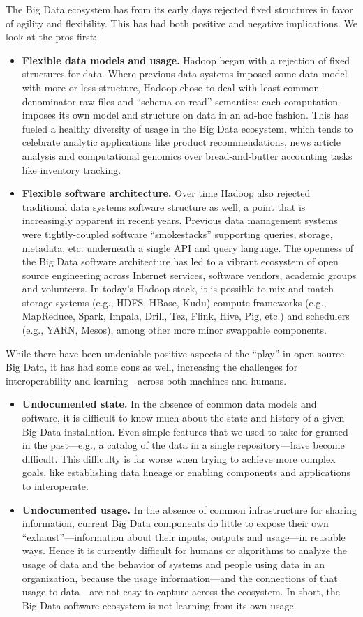 \documentclass[10pt,letterpaper]{article}
\begin{document}
The Big Data ecosystem has from its early days rejected fixed structures in favor of agility and flexibility.  This has had both positive and negative implications.  We look at the pros first:
\begin{itemize}
\item \textbf{Flexible data models and usage.} Hadoop began with a rejection of fixed structures for data.  Where previous data systems imposed some data model with more or less structure, Hadoop chose to deal with least-common-denominator raw files and ``schema-on-read'' semantics: each computation imposes its own model and structure on data in an ad-hoc fashion.  This has fueled a healthy diversity of usage in the Big Data ecosystem, which tends to celebrate analytic applications like product recommendations, news article analysis and computational genomics over bread-and-butter accounting tasks like inventory tracking.
\item \textbf{Flexible software architecture.} Over time Hadoop also rejected traditional data systems software structure as well, a point that is increasingly apparent in recent years.  Previous data management systems were tightly-coupled software ``smokestacks'' supporting queries, storage, metadata, etc. underneath a single API and query language.  The openness of the Big Data software architecture has led to a vibrant ecosystem of open source engineering across Internet services, software vendors, academic groups and volunteers.  In today's Hadoop stack, it is possible to mix and match storage systems (e.g., HDFS, HBase, Kudu) compute frameworks (e.g., MapReduce, Spark, Impala, Drill, Tez, Flink, Hive, Pig, etc.) and schedulers (e.g., YARN, Mesos), among other more minor swappable components. 
\end{itemize}

While there have been undeniable positive aspects of the ``play'' in open source Big Data, it has had some cons as well, increasing the challenges for interoperability and learning---across both machines and humans.
\begin{itemize}
\item \textbf{Undocumented state.}  In the absence of common data models and software, it is difficult to know much about the state and history of a given Big Data installation.  Even simple features that we used to take for granted in the past---e.g., a catalog of the data in a single repository---have become difficult.  This difficulty is far worse when trying to achieve more complex goals, like establishing data lineage or enabling components and applications to interoperate.
\item \textbf{Undocumented usage.} In the absence of common infrastructure for sharing information, current Big Data components do little to expose their own ``exhaust''---information about their inputs, outputs and usage---in reusable ways.  Hence it is currently difficult for humans or algorithms to analyze the usage of data and the behavior of systems and people using data in an organization, because the usage information---and the connections of that usage to data---are not easy to capture across the ecosystem.  In short, the Big Data software ecosystem is not learning from its own usage.
\end{itemize}
\end{document}
